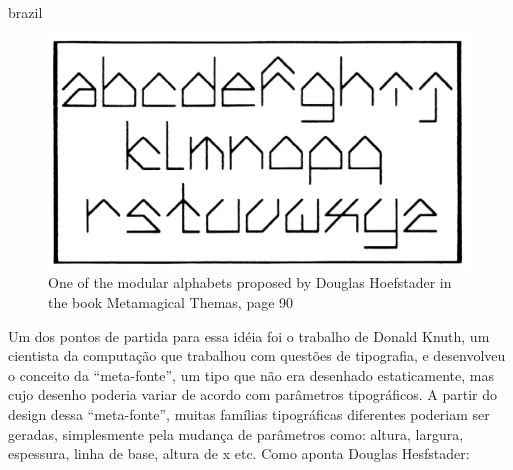 \begin{otherlanguage*}{brazil}



\begin{figure}[!ht]
    \centering
        \includegraphics[width=0.8\linewidth]{pictures/metamagical}
        \vspace{-10pt}
    \caption{One of the modular alphabets proposed by Douglas Hoefstader in the book Metamagical Themas, page 90}
    \label{fig:metamagical}
\end{figure} 

Um dos pontos de partida para essa idéia foi o trabalho de Donald Knuth, um cientista da computação que trabalhou com questões de tipografia, e desenvolveu o conceito da ``meta-fonte'', um tipo que não era desenhado estaticamente, mas cujo desenho poderia variar de acordo com parâmetros tipográficos\cite{knuth-meta-font_1982}. A partir do design dessa ``meta-fonte'', muitas famílias tipográficas diferentes poderiam ser geradas, simplesmente pela mudança de parâmetros como: altura, largura, espessura, linha de base, altura de x etc. Como aponta Douglas Hesfstader:


\end{otherlanguage*}
